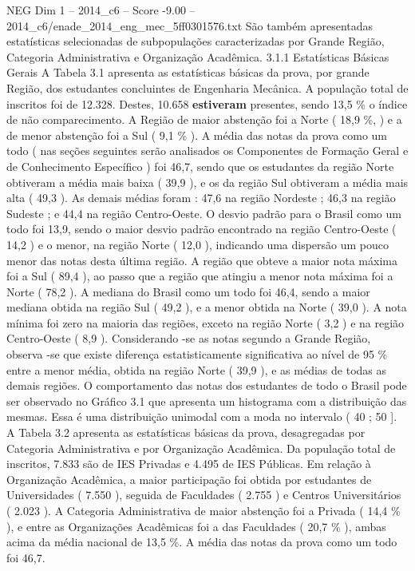 \begin{textsample}{NEG Dim 1 – 2014\_c6 – Score -9.00 – 2014\_c6/enade\_2014\_eng\_mec\_5ff0301576.txt}
São também apresentadas estatísticas selecionadas de subpopulações caracterizadas por Grande Região, Categoria Administrativa e Organização Acadêmica. 3.1.1 Estatísticas Básicas Gerais A Tabela 3.1 apresenta as estatísticas básicas da prova, por grande Região, dos estudantes concluintes de Engenharia Mecânica.
A população total de inscritos foi de 12.328.
Destes, 10.658 \textbf{estiveram} presentes, sendo 13,5 \% o índice de não comparecimento.
A Região de maior abstenção foi a Norte ( 18,9 \%, ) e a de menor abstenção foi a Sul ( 9,1 \% ).
A média das notas da prova como um todo ( nas seções seguintes serão analisados os Componentes de Formação Geral e de Conhecimento Específico ) foi 46,7, sendo que os estudantes da região Norte obtiveram a média mais baixa ( 39,9 ), e os da região Sul obtiveram a média mais alta ( 49,3 ).
As demais médias foram : 47,6 na região Nordeste ; 46,3 na região Sudeste ; e 44,4 na região Centro-Oeste.
O desvio padrão para o Brasil como um todo foi 13,9, sendo o maior desvio padrão encontrado na região Centro-Oeste ( 14,2 ) e o menor, na região Norte ( 12,0 ), indicando uma dispersão um pouco menor das notas desta última região.
A região que obteve a maior nota máxima foi a Sul ( 89,4 ), ao passo que a região que atingiu a menor nota máxima foi a Norte ( 78,2 ).
A mediana do Brasil como um todo foi 46,4, sendo a maior mediana obtida na região Sul ( 49,2 ), e a menor obtida na Norte ( 39,0 ).
A nota mínima foi zero na maioria das regiões, exceto na região Norte ( 3,2 ) e na região Centro-Oeste ( 8,9 ).
Considerando -se as notas segundo a Grande Região, observa -se que existe diferença estatisticamente significativa ao nível de 95 \% entre a menor média, obtida na região Norte ( 39,9 ), e as médias de todas as demais regiões.
O comportamento das notas dos estudantes de todo o Brasil pode ser observado no Gráfico 3.1 que apresenta um histograma com a distribuição das mesmas.
Essa é uma distribuição unimodal com a moda no intervalo ( 40 ; 50 ].
A Tabela 3.2 apresenta as estatísticas básicas da prova, desagregadas por Categoria Administrativa e por Organização Acadêmica.
Da população total de inscritos, 7.833 são de IES Privadas e 4.495 de IES Públicas.
Em relação à Organização Acadêmica, a maior participação foi obtida por estudantes de Universidades ( 7.550 ), seguida de Faculdades ( 2.755 ) e Centros Universitários ( 2.023 ).
A Categoria Administrativa de maior abstenção foi a Privada ( 14,4 \% ), e entre as Organizações Acadêmicas foi a das Faculdades ( 20,7 \% ), ambas acima da média nacional de 13,5 \%.
A média das notas da prova como um todo foi 46,7.

\end{textsample}
